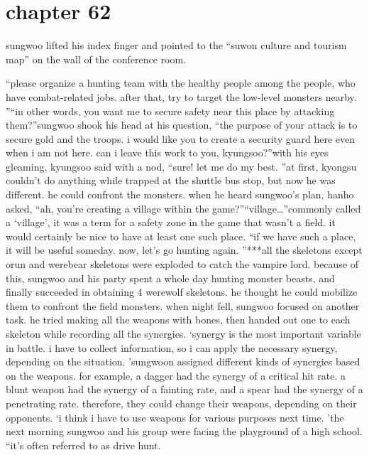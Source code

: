\section{chapter 62}

                            sungwoo lifted his index finger and pointed to the “suwon culture and tourism map” on the wall of the conference room.





“please organize a hunting team with the healthy people among the people, who have combat-related jobs.
 after that, try to target the low-level monsters nearby.
”“in other words, you want me to secure safety near this place by attacking them?”sungwoo shook his head at his question, “the purpose of your attack is to secure gold and the troops.
 i would like you to create a security guard here even when i am not here.
 can i leave this work to you, kyungsoo?”with his eyes gleaming, kyungsoo said with a nod, “sure! let me do my best.
”at first, kyongsu couldn’t do anything while trapped at the shuttle bus stop, but now he was different.
 he could confront the monsters.
when he heard sungwoo’s plan, hanho asked, “ah, you’re creating a village within the game?”“village…”commonly called a ‘village’, it was a term for a safety zone in the game that wasn’t a field.
 it would certainly be nice to have at least one such place.
“if we have such a place, it will be useful someday.
 now, let’s go hunting again.
”***all the skeletons except orun and werebear skeletons were exploded to catch the vampire lord.
because of this, sungwoo and his party spent a whole day hunting monster beasts, and finally succeeded in obtaining 4 werewolf skeletons.
 he thought he could mobilize them to confront the field monsters.
when night fell, sungwoo focused on another task.
 he tried making all the weapons with bones, then handed out one to each skeleton while recording all the synergies.
‘synergy is the most important variable in battle.
 i have to collect information, so i can apply the necessary synergy, depending on the situation.
’sungwoon assigned different kinds of synergies based on the weapons.
 for example, a dagger had the synergy of a critical hit rate.
 a blunt weapon had the synergy of a fainting rate, and a spear had the synergy of a penetrating rate.
 therefore, they could change their weapons, depending on their opponents.
‘i think i have to use weapons for various purposes next time.
’the next morning sungwoo and his group were facing the playground of a high school.
“it’s often referred to as drive hunt.
